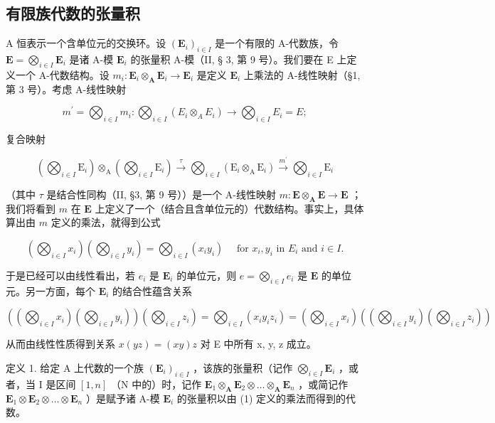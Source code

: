 \subsection{有限族代数的张量积}

A 恒表示一个含单位元的交换环。设 \((\mathbf{E}_i)_{i\in I}\) 是一个有限的 A-代数族，令 \(\mathbf{E} = \bigotimes_{i\in I}\mathbf{E}_i\) 是诸 A-模 \(\mathbf{E}_i\) 的张量积 A-模（II, § 3, 第 9 号）。我们要在 E 上定义一个 A-代数结构。设 \(m_i\colon \mathbf{E}_i\otimes_\mathbf{A}\mathbf{E}_i\to \mathbf{E}_i\) 是定义 \(\mathbf{E}_i\) 上乘法的 A-线性映射（§1, 第 3 号）。考虑 A-线性映射

\[
m ^ {\prime} = \bigotimes_ {i \in I} m _ {i}: \bigotimes_ {i \in I} (E _ {i} \otimes_ {A} E _ {i}) \rightarrow \bigotimes_ {i \in I} E _ {i} = E;
\]

复合映射

\[
\left(\bigotimes_ {i \in I} \mathrm{E} _ {i}\right) \otimes_ {\mathrm{A}} \left(\bigotimes_ {i \in I} \mathrm{E} _ {i}\right) \xrightarrow {\tau} \bigotimes_ {i \in I} \left(\mathrm{E} _ {i} \otimes_ {\mathrm{A}} \mathrm{E} _ {i}\right) \xrightarrow {m ^ {\prime}} \bigotimes_ {i \in I} \mathrm{E} _ {i}
\]

（其中 \(\tau\) 是结合性同构（II, §3, 第 9 号））是一个 A-线性映射 \(m\colon \mathbf{E} \otimes_{\mathbf{A}} \mathbf{E} \to \mathbf{E}\) ；我们将看到 \(m\) 在 \(\mathbf{E}\) 上定义了一个（结合且含单位元的）代数结构。事实上，具体算出由 \(m\) 定义的乘法，就得到公式

\[
\left(\bigotimes_ {i \in I} x _ {i}\right) \left(\bigotimes_ {i \in I} y _ {i}\right) = \bigotimes_ {i \in I} \left(x _ {i} y _ {i}\right) \quad \text { for } x _ {i}, y _ {i} \text { in } E _ {i} \text { and } i \in I.\tag{1}
\]

于是已经可以由线性看出，若 \(e_i\) 是 \(\mathbf{E}_i\) 的单位元，则 \(e = \bigotimes_{i \in I} e_i\) 是 \(\mathbf{E}\) 的单位元。另一方面，每个 \(\mathbf{E}_i\) 的结合性蕴含关系

\[
\left(\left(\bigotimes_ {i \in I} x _ {i}\right) \left(\bigotimes_ {i \in I} y _ {i}\right)\right) \left(\bigotimes_ {i \in I} z _ {i}\right) = \bigotimes_ {i \in I} \left(x _ {i} y _ {i} z _ {i}\right) = \left(\bigotimes_ {i \in I} x _ {i}\right) \left(\left(\bigotimes_ {i \in I} y _ {i}\right) \left(\bigotimes_ {i \in I} z _ {i}\right)\right)
\]

从而由线性性质得到关系 \(x(yz) = (xy)z\) 对 E 中所有 x, y, z 成立。

定义 1. 给定 A 上代数的一个族 \((\mathbf{E}_i)_{i\in I}\) ，该族的张量积（记作 \(\bigotimes_{i\in I}\mathbf{E}_i\) ，或者，当 I 是区间 \([1,n]\) （N 中的）时，记作 \(\mathbf{E}_1\otimes_\mathbf{A}\mathbf{E}_2\otimes \dots \otimes_\mathbf{A}\mathbf{E}_n\) ，或简记作 \(\mathbf{E}_1\otimes \mathbf{E}_2\otimes \dots \otimes \mathbf{E}_n\) ）是赋予诸 A-模 \(\mathbf{E}_i\) 的张量积以由 (1) 定义的乘法而得到的代数。

